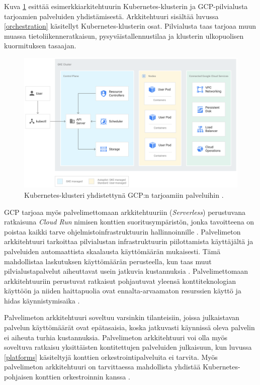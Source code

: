 Kuva \ref{fig:architecture} esittää esimerkkiarkitehtuurin Kubernetes-klusterin ja GCP-pilvialusta tarjoamien palveluiden yhdistämisestä.
Arkkitehtuuri sisältää luvussa \ref{orchestration} käsitellyt Kubernetes-klusterin osat.
Pilvialusta taas tarjoaa muun muassa tietoliikenneratkaisun, pysyväistallennustilaa ja klusterin ulkopuolisen kuormituksen tasaajan.


\begin{figure}[ht]
\begin{center}
\includegraphics[width=1\textwidth]{figures/gke_architecture.png}
\caption{Kubernetes-klusteri yhdistettynä GCP:n tarjoamiin palveluihin \cite{cluster23}\label{fig:architecture}.}
\end{center}
\end{figure}

GCP tarjoaa myös palvelimettomaan arkkitehtuuriin (\textit{Serverless}) perustuvana ratkaisuna \textit{Cloud Run} nimisen konttien suoritusympäristön, jonka tavoitteena on poistaa kaikki tarve ohjelmistoinfrastruktuurin hallinnoinnille \cite{Products23}.
Palvelimeton arkkitehtuuri tarkoittaa pilvialustan infrastruktuurin piilottamista käyttäjältä ja palveluiden automaattista skaalausta käyttömäärän mukaisesti.
Tämä mahdollistaa laskutuksen käyttömäärän perusteella, kun taas muut pilvialustapalvelut aiheuttavat usein jatkuvia kustannuksia \cite{shafiei22}.
Palvelimettomaan arkkitehtuuriin perustuvat ratkaisut pohjautuvat yleensä konttiteknologian käyttöön ja niiden haittapuolia ovat ennalta-arvaamaton resurssien käyttö ja hidas käynnistymisaika \cite{shafiei22, mondal22}.

Palvelimeton arkkitehtuuri soveltuu varsinkin tilanteisiin, joissa julkaistavan palvelun käyttömäärät ovat epätasaisia, koska jatkuvasti käynnissä oleva palvelin ei aiheuta turhia kustannuksia.
Palvelimeton arkkitehtuuri voi olla myös soveltuva ratkaisu yksittäisten kontitettujen palveluiden julkaisuun, kun luvussa \ref{platforms} käsiteltyjä konttien orkestrointipalveluita ei tarvita.
Myös palvelimeton arkkitehtuuri on tarvittaessa mahdollista yhdistää Kubernetes-pohjaisen konttien orkestroinnin kanssa \cite{mondal22}.

